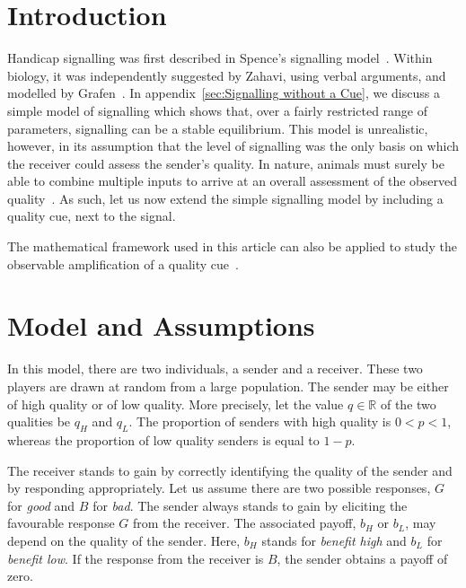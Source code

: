 \documentclass[a4paper,12pt]{article}
\numberwithin{equation}{section}
\begin{document}
\tableofcontents

\newpage


\section{Introduction}
\label{sec:Introduction}

Handicap signalling was first described in Spence's signalling model~\cite{Spence1973}. Within biology, it was independently suggested by Zahavi, using verbal arguments, and modelled by Grafen~\cite{Zahavi1975, Zahavi1977, Grafen1990, Grafen1990a}. In appendix~\ref{sec:Signalling without a Cue}, we discuss a simple model of signalling which shows that, over a fairly restricted range of parameters, signalling can be a stable equilibrium. This model is unrealistic, however, in its assumption that the level of signalling was the only basis on which the receiver could assess the sender's quality. In nature, animals must surely be able to combine multiple inputs to arrive at an overall assessment of the observed quality~\cite{Jennions1997, Candolin2003}. As such, let us now extend the simple signalling model by including a quality cue, next to the signal. 


The mathematical framework used in this article can also be applied to study the observable amplification of a quality cue~\cite{Bogaardt2014}.

\newpage


\section{Model and Assumptions}
\label{sec:Model and Assumptions}

In this model, there are two individuals, a sender and a receiver. These two players are drawn at random from a large population. The sender may be either of high quality or of low quality. More precisely, let the value $q \in \mathbb{R}$ of the two qualities be $q_{H}$ and $q_{L}$. The proportion of senders with high quality is $0<p<1$, whereas the proportion of low quality senders is equal to $1-p$.

The receiver stands to gain by correctly identifying the quality of the sender and by responding appropriately. Let us assume there are two possible responses, $G$ for \textit{good} and $B$ for \textit{bad}. The sender always stands to gain by eliciting the favourable response $G$ from the receiver. The associated payoff, $b_{H}$ or $b_{L}$, may depend on the quality of the sender. Here, $b_{H}$ stands for \textit{benefit high} and $b_{L}$ for \textit{benefit low}. If the response from the receiver is $B$, the sender obtains a payoff of zero.
\end{document}
